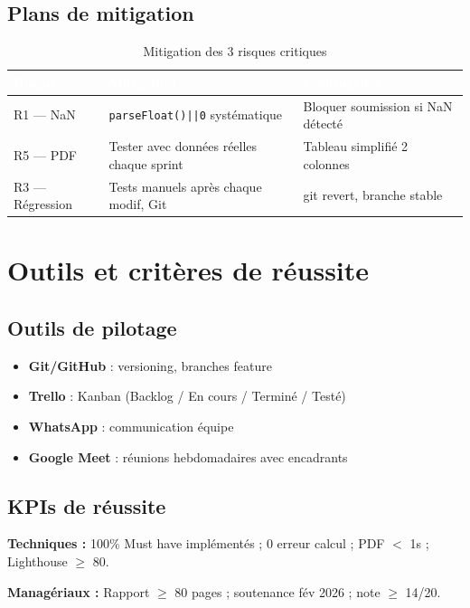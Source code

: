 \subsection{Plans de mitigation}

\begin{table}[H]
\centering
\caption{Mitigation des 3 risques critiques}
\label{tab:mitigation}
\begin{tabularx}{\textwidth}{|l|X|X|}
\hline
\rowcolor{emsiblue}\textcolor{white}{\textbf{Risque}} & \textcolor{white}{\textbf{Mitigation}} & \textcolor{white}{\textbf{Contingence}} \\
\hline
R1 — NaN & \texttt{parseFloat()||0} systématique & Bloquer soumission si NaN détecté \\
R5 — PDF & Tester avec données réelles chaque sprint & Tableau simplifié 2 colonnes \\
R3 — Régression & Tests manuels après chaque modif, Git & git revert, branche stable \\
\hline
\end{tabularx}
\end{table}

\section{Outils et critères de réussite}

\subsection{Outils de pilotage}
\begin{itemize}
    \item \textbf{Git/GitHub} : versioning, branches feature
    \item \textbf{Trello} : Kanban (Backlog / En cours / Terminé / Testé)
    \item \textbf{WhatsApp} : communication équipe
    \item \textbf{Google Meet} : réunions hebdomadaires avec encadrants
\end{itemize}

\subsection{KPIs de réussite}

\textbf{Techniques :} 100\% Must have implémentés ; 0 erreur calcul ; PDF $<$ 1s ; Lighthouse $\geq$ 80.

\textbf{Managériaux :} Rapport $\geq$ 80 pages ; soutenance fév 2026 ; note $\geq$ 14/20.
